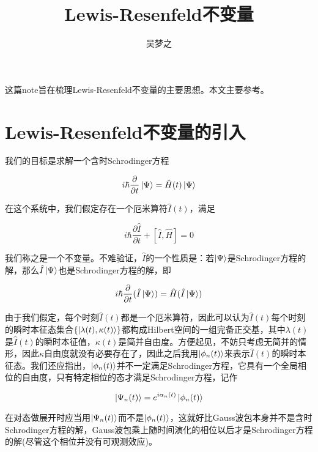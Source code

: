 \documentclass[a4paper]{article}
\title{Lewis-Resenfeld不变量}
\author{吴梦之}
\begin{document}
    \maketitle

    这篇note旨在梳理Lewis-Resenfeld不变量的主要思想。本文主要参考。

    \section{Lewis-Resenfeld不变量的引入}
        我们的目标是求解一个含时Schrodinger方程

        \begin{equation}
            i\hbar\frac{\partial}{\partial t}\ket{\Psi} = \hat{H}(t)\ket{\Psi}
        \end{equation}

        在这个系统中，我们假定存在一个厄米算符$\hat{I}(t)$，满足

        \begin{equation}
            i\hbar\frac{\partial\hat{I}}{\partial t} + [\hat{I}, \hat{H}] = 0
        \end{equation}

        我们称之是一个不变量。不难验证，$\hat{I}$的一个性质是：若$\ket{\Psi}$是Schrodinger方程的解，那么$\hat{I}\ket{\Psi}$也是Schrodinger方程的解，即

        \begin{equation}
            i\hbar\frac{\partial}{\partial t}(\hat{I}\ket{\Psi}) = \hat{H} (\hat{I}\ket{\Psi})
        \end{equation}

        由于我们假定，每个时刻$\hat{I}(t)$都是一个厄米算符，因此可以认为$\hat{I}(t)$每个时刻的瞬时本征态集合$\{\ket{\lambda(t),\kappa(t)}\}$都构成Hilbert空间的一组完备正交基，其中$\lambda(t)$是$\hat{I}(t)$的瞬时本征值，$\kappa(t)$是简并自由度。方便起见，不妨只考虑无简并的情形，因此$\kappa$自由度就没有必要存在了，因此之后我用$\ket{\phi_n(t)}$来表示$\hat{I}(t)$的瞬时本征态。我们还应指出，$\ket{\phi_n(t)}$并不一定满足Schrodinger方程，它具有一个全局相位的自由度，只有特定相位的态才满足Schrodinger方程，记作

        \begin{equation}
            \ket{\Psi_n(t)}=e^{i\alpha_n(t)}\ket{\phi_n(t)}
        \end{equation}

        在对态做展开时应当用$\ket{\Psi_n(t)}$而不是$\ket{\phi_n(t)}$，这就好比Gauss波包本身并不是含时Schrodinger方程的解，Gauss波包乘上随时间演化的相位以后才是Schrodinger方程的解(尽管这个相位并没有可观测效应)。
\end{document}
